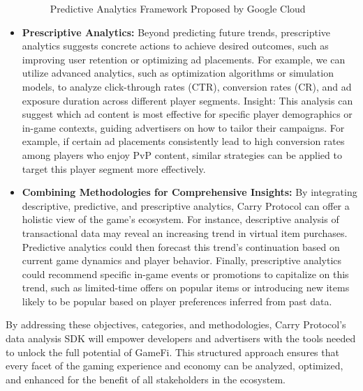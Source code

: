 \begin{itemize}
\begin{figure}[!htb]
    \caption{Predictive Analytics Framework Proposed by Google Cloud}
    \label{fig:prediction}
\end{figure}
\item \textbf{Prescriptive Analytics:}
Beyond predicting future trends, prescriptive analytics suggests concrete actions to achieve desired outcomes, such as improving user retention or optimizing ad placements. For example, we can utilize advanced analytics, such as optimization algorithms or simulation models, to analyze click-through rates (CTR), conversion rates (CR), and ad exposure duration across different player segments.
Insight: This analysis can suggest which ad content is most effective for specific player demographics or in-game contexts, guiding advertisers on how to tailor their campaigns. For example, if certain ad placements consistently lead to high conversion rates among players who enjoy PvP content, similar strategies can be applied to target this player segment more effectively.
\item \textbf{Combining Methodologies for Comprehensive Insights:} By integrating descriptive, predictive, and prescriptive analytics, Carry Protocol can offer a holistic view of the game's ecosystem. For instance, descriptive analysis of transactional data may reveal an increasing trend in virtual item purchases. Predictive analytics could then forecast this trend's continuation based on current game dynamics and player behavior. Finally, prescriptive analytics could recommend specific in-game events or promotions to capitalize on this trend, such as limited-time offers on popular items or introducing new items likely to be popular based on player preferences inferred from past data.

\end{itemize}

By addressing these objectives, categories, and methodologies, Carry Protocol's data analysis SDK will empower developers and advertisers with the tools needed to unlock the full potential of GameFi. This structured approach ensures that every facet of the gaming experience and economy can be analyzed, optimized, and enhanced for the benefit of all stakeholders in the ecosystem.